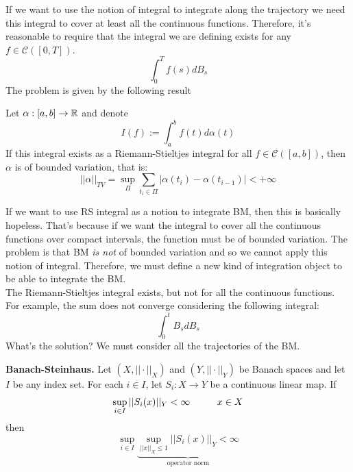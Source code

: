 If we want to use the notion of integral to integrate along the trajectory we need this integral to cover at least all the continuous functions. Therefore, it's reasonable to require that the integral we are defining 
exists for any $f \in \mathcal{C}([0,T])$.
\begin{equation*}
    \int_0^T f(s) dB_s
\end{equation*}
The problem is given by the following result 
\begin{PropBox}
    \begin{Proposition}
    Let $\alpha:[a,b]\to \mathbb{R}$ and denote 
    \begin{equation*}
        I(f):= \int_a^bf(t)d\alpha(t)
    \end{equation*}
    If this integral exists as a Riemann-Stieltjes integral for all $f \in \mathcal{C}([a,b])$, then $\alpha$ is of bounded variation, that is:
    \begin{equation*}
    ||\alpha||_{TV} = \sup_{\Pi} \sum_{t_i \in \Pi} |\alpha(t_i)-\alpha(t_{i-1})| < + \infty
\end{equation*}
\end{Proposition}
\end{PropBox}
If we want to use RS integral as a notion to integrate BM, then this is basically hopeless. That's because if we want the integral to cover all the continuous functions over compact intervals, the function must be of bounded variation. The problem is that BM \emph{is not} of bounded variation and so we cannot apply this notion of integral. Therefore, we must define a new kind of integration object to be able to integrate the BM. \\
The Riemann-Stieltjes integral exists, but not for all the continuous functions. \\
For example, the sum does not converge considering the following integral:
\begin{equation*}
    \int_0^t B_s dB_s
\end{equation*}
What's the solution? We must consider all the trajectories of the BM. 
    \begin{PropBox}
        \begin{remark}
        \textbf{Banach-Steinhaus.} Let $(X, ||\cdot||_X)$ and $(Y, ||\cdot||_Y)$ be Banach spaces and let $I$ be any index set. For each $i\in I$, let $S_i: X \to Y$ be a continuous linear map. If 
        \begin{equation*}
            \sup_{i \in I} ||S_i(x)||_Y < \infty \hspace{1 cm} x \in X
        \end{equation*}
    then 
    \begin{equation*}
         \sup_{i \in I} \underbrace{ \sup_{||x||_X \leq 1} ||S_i(x)||_Y < \infty }_{\text{operator norm}}
    \end{equation*}
    \end{remark}
    \end{PropBox}
